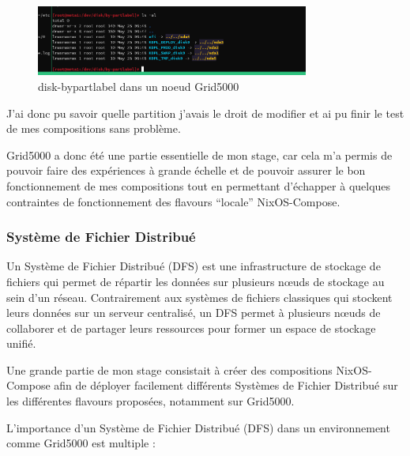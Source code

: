 \documentclass[a4paper,french,12pt, titlepage]{article}
\begin{document}
\begin{figure}[h]
\centering
\includegraphics[width=0.8\textwidth,height=0.8\textheight,keepaspectratio]{annexe/disk_g5k.png}
\caption{disk-bypartlabel dans un noeud Grid5000}
\end{figure}

J'ai donc pu savoir quelle partition j'avais le droit de modifier et ai
pu finir le test de mes compositions sans problème.\newline

Grid5000 a donc été une partie essentielle de mon stage, car cela m'a
permis de pouvoir faire des expériences à grande échelle et de pouvoir
assurer le bon fonctionnement de mes compositions tout en permettant
d'échapper à quelques contraintes de fonctionnement des flavours
``locale'' NixOS-Compose.\newline

\hypertarget{systuxe8me-de-fichier-distribuuxe9}{%
\subsubsection{Système de Fichier
Distribué}\label{systuxe8me-de-fichier-distribuuxe9}}

Un Système de Fichier Distribué (DFS) est une infrastructure de stockage
de fichiers qui permet de répartir les données sur plusieurs nœuds de
stockage au sein d'un réseau. Contrairement aux systèmes de fichiers
classiques qui stockent leurs données sur un serveur centralisé, un DFS
permet à plusieurs nœuds de collaborer et de partager leurs ressources
pour former un espace de stockage unifié.\newline

Une grande partie de mon stage consistait à créer des compositions
NixOS-Compose afin de déployer facilement différents Systèmes de Fichier
Distribué sur les différentes flavours proposées, notamment sur
Grid5000.\newline

L'importance d'un Système de Fichier Distribué (DFS) dans un
environnement comme Grid5000 est multiple :\newline
\end{document}
